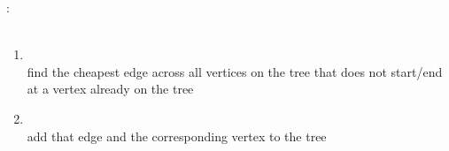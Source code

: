 \documentclass[mathserif, handout]{beamer}
\begin{document}
\begin{frame}
  \begin{thmbox}
    : \\
     \\[-4mm]
    \begin{enumerate}
      \item {} \\
            \color{gray}\footnotesize find the cheapest edge across all vertices on the tree that does not start/end at a vertex already on the tree\color{black}\normalsize
      \item {} \\
            \color{gray}\footnotesize add that edge and the corresponding vertex to the tree\color{black}\normalsize
    \end{enumerate}
  \end{thmbox}
\end{frame}
\end{document}
